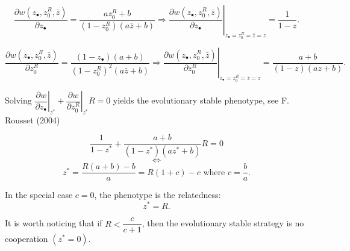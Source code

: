 \documentclass{article}
\begin{document}
  \begin{equation}
  \dfrac{\partial w(z_\bullet ,z_0^R , \bar{z} )}{\partial z_\bullet} = \dfrac{a z_0^R +b }{ (1 - z_0^R) (a \bar{z} +b) } \Rightarrow \left. \dfrac{\partial w(z_\bullet ,z_0^R , \bar{z} )}{\partial z_\bullet} \right\vert_{z_\bullet = z_0^R = \bar{z}=z} = \dfrac{1}{ 1 - z }.
  \end{equation}
  
  \begin{equation}
  \dfrac{\partial w(z_\bullet ,z_0^R , \bar{z} )}{\partial z_0^R} = \dfrac{(1- z_\bullet)(a +b)}{(1- z_0^R)^2(a \bar{z} +b)} \Rightarrow \left. \dfrac{\partial w(z_\bullet ,z_0^R , \bar{z} )}{\partial z_0^R} \right\vert_{z_\bullet = z_0^R = \bar{z}=z} = \dfrac{a +b}{(1- z)(a z +b)}.
  \end{equation}
  
  Solving $\left. \dfrac{\partial w}{\partial z_\bullet} \right\vert_{z^*} + \left. \dfrac{\partial w}{\partial z_0^R} \right\vert_{z^*} R =0 $ yields the evolutionary stable phenotype, see F. Rousset (2004) 
  
    \begin{equation}
  \dfrac{1}{ 1 - z^* } + \dfrac{a +b}{(1- z^*)(a z^* +b)}R =0
  \end{equation}
  \begin{equation}
  \iff
  \end{equation}
  \begin{equation}
  z^*=\dfrac{R(a+b)-b}{a}=R(1+c)-c \text{ where }c=\dfrac{b}{a}.
  \end{equation}
  
  
  In the special case $c=0$, the phenotype is the relatedness:
  \begin{equation}
  z^*=R.
  \end{equation}
  
  
  It is worth noticing that if $R<\dfrac{c}{c+1}$, then the evolutionary stable strategy is no cooperation $(z^*=0)$.
\end{document}
